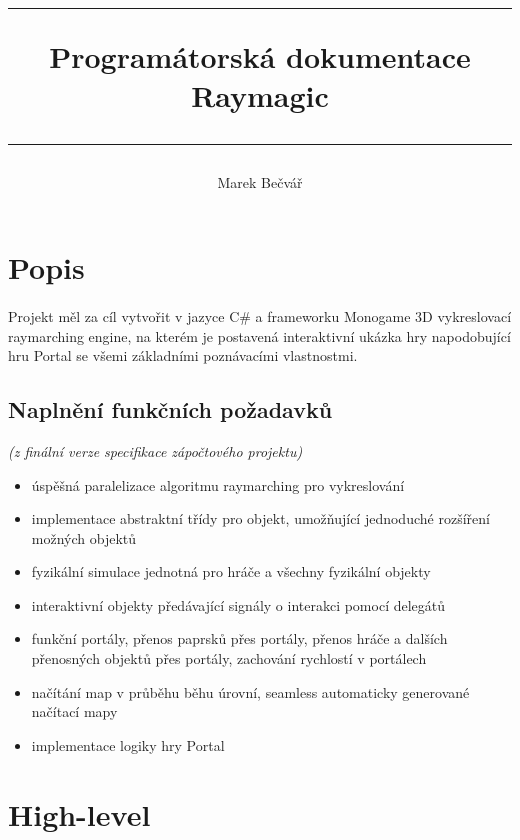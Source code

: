 \documentclass[a4paper, 12pt]{article}
\title{
        \vspace{1in}
        \rule{\linewidth}{0.5pt}
		\usefont{OT1}{bch}{b}{n}
        \huge Programátorská dokumentace \\Raymagic\\
        \vspace{-10pt}
        \rule{\linewidth}{1pt}
}
\author{
		\normalfont\normalsize
        Marek Bečvář\\[-3pt]\normalsize
}
\date{}
\begin{document}
\maketitle 
\newpage

\tableofcontents
\newpage

\section{Popis} 
\paragraph{} 
Projekt měl za cíl vytvořit v jazyce C\# a frameworku Monogame 3D vykreslovací
raymarching engine, na kterém je postavená interaktivní ukázka hry napodobující 
hru Portal se všemi základními poznávacími vlastnostmi.

\subsection{Naplnění funkčních požadavků}
\emph{(z finální verze specifikace zápočtového projektu)}

\vspace{-5px}
\begin{itemize}
    \item úspěšná paralelizace algoritmu raymarching pro vykreslování
    \item implementace abstraktní třídy pro objekt, umožňující jednoduché
        rozšíření možných objektů
    \item fyzikální simulace jednotná pro hráče a všechny fyzikální objekty
    \item interaktivní objekty předávající signály o interakci pomocí delegátů
    \item funkční portály, přenos paprsků přes portály, přenos hráče a dalších
        přenosných objektů přes portály, zachování rychlostí v portálech
    \item načítání map v průběhu běhu úrovní, seamless automaticky generované
        načítací mapy
    \item implementace logiky hry Portal
\end{itemize}

\section{High-level}
\end{document}
